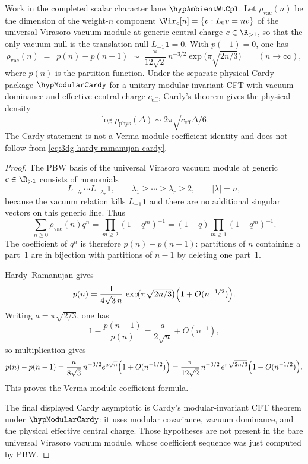 \begin{proposition}
\label{prop:3dg-hardy-ramanujan-cardy}
%
Work in the completed scalar character lane \(\hypAmbientWtCpl\). Let
\(\rho_{\mathrm{vac}}(n)\) be the dimension of the weight-\(n\)
component
\(\Vir_c[n]=\{v:L_0v=nv\}\) of the universal Virasoro vacuum module at
generic central charge \(c\in\R_{>1}\), so that the only vacuum null is
the translation null \(L_{-1}\mathbf1=0\). With \(p(-1)=0\), one has
\begin{equation}
\label{eq:3dg-hardy-ramanujan-cardy}
\rho_{\mathrm{vac}}(n)
\;=\;
\ p(n)-p(n-1)
\;\sim\;
\frac{\pi}{12\sqrt2}\,n^{-3/2}
\exp\!\bigl(\pi\sqrt{2n/3}\bigr)
\qquad (n \to \infty),
\end{equation}
where \(p(n)\) is the partition function. Under the separate physical
Cardy package \(\hypModularCardy\) for a unitary modular-invariant CFT
with vacuum dominance and effective central charge \(c_{\mathrm{eff}}\),
Cardy's theorem \cite{Cardy86} gives the physical density
\[
\log\rho_{\mathrm{phys}}(\Delta)
\sim 2\pi\sqrt{c_{\mathrm{eff}}\Delta/6}.
\]
The Cardy statement is not a Verma-module coefficient identity and does
not follow from \eqref{eq:3dg-hardy-ramanujan-cardy}.
\end{proposition}

\begin{proof}
The PBW basis of the universal Virasoro vacuum module at generic
\(c\in\R_{>1}\) consists of monomials
\[
L_{-\lambda_1}\cdots L_{-\lambda_r}\mathbf1,
\qquad
\lambda_1\ge\cdots\ge\lambda_r\ge2,
\qquad
|\lambda|=n,
\]
because the vacuum relation kills \(L_{-1}\mathbf1\) and there are no
additional singular vectors on this generic line. Thus
\[
\sum_{n\ge0}\rho_{\mathrm{vac}}(n)q^n
=\prod_{m\ge2}(1-q^m)^{-1}
=(1-q)\prod_{m\ge1}(1-q^m)^{-1}.
\]
The coefficient of \(q^n\) is therefore \(p(n)-p(n-1)\): partitions of
\(n\) containing a part~\(1\) are in bijection with partitions of
\(n-1\) by deleting one part~\(1\).

Hardy--Ramanujan \cite{HardyRamanujan1918} gives
\[
p(n)=\frac{1}{4\sqrt3\,n}
\,\exp\!\bigl(\pi\sqrt{2n/3}\bigr)
\Bigl(1+O(n^{-1/2})\Bigr).
\]
Writing \(a=\pi\sqrt{2/3}\), one has
\[
1-\frac{p(n-1)}{p(n)}
=\frac{a}{2\sqrt n}+O(n^{-1}),
\]
so multiplication gives
\[
p(n)-p(n-1)
=\frac{a}{8\sqrt3}\,n^{-3/2}e^{a\sqrt n}
\Bigl(1+O(n^{-1/2})\Bigr)
=
\frac{\pi}{12\sqrt2}\,n^{-3/2}
\,e^{\pi\sqrt{2n/3}}
\Bigl(1+O(n^{-1/2})\Bigr).
\]
This proves the Verma-module coefficient formula.

The final displayed Cardy asymptotic is Cardy's modular-invariant CFT
theorem under \(\hypModularCardy\): it uses modular covariance, vacuum
dominance, and the physical effective central charge. Those hypotheses
are not present in the bare universal Virasoro vacuum module, whose
coefficient sequence was just computed by PBW.
\end{proof}

